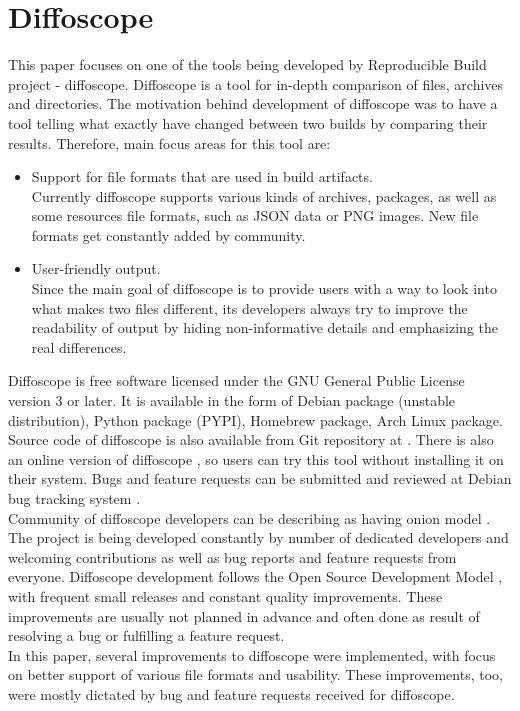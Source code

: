 \section{Diffoscope}

This paper focuses on one of the tools being developed by
Reproducible Build project - diffoscope.
Diffoscope is a tool for in-depth comparison of files, archives and
directories\cite{dfs}.
The motivation behind development of diffoscope was to have a tool
telling what exactly have changed between two builds by comparing 
their results. Therefore, main focus areas for this tool are:
\begin{itemize}
    \item Support for file formats that are used in build artifacts. \\
    Currently diffoscope supports various kinds of archives, packages,
    as well as some resources file formats, such as JSON data or PNG images.
    New file formats get constantly added by community.
    \item User-friendly output.\\
    Since the main goal of diffoscope is to provide users with a way to look
    into what makes two files different, its developers always try to
    improve the readability of output by hiding non-informative details and
    emphasizing the real differences.
\end{itemize}

Diffoscope is free software licensed under the GNU General Public 
License version 3 or later.
It is available in the form of Debian package (unstable distribution), 
Python package (PYPI), Homebrew package, Arch Linux package. Source code
of diffoscope is also available from Git repository at \cite{dfs-git}. 
There is also an online version of diffoscope \cite{try-dfs}, so users 
can try this tool without installing it on their system.
Bugs and feature requests can be submitted and reviewed at Debian
bug tracking system \cite{dfs-bugs}.\\
Community of diffoscope developers can be describing as having
onion model \cite{aberdour2007achieving}.
The project is being developed constantly by number of dedicated 
developers and welcoming contributions as well as bug reports 
and feature requests from everyone.
Diffoscope development follows the Open Source Development Model 
\cite{osdm}, with frequent small releases and constant quality improvements.
These improvements are usually not planned in advance and often
done as result of resolving a bug or fulfilling a feature request.\\
In this paper, several improvements to diffoscope were implemented,
with focus on better support of various file formats and usability.
These improvements, too, were mostly dictated by bug and feature requests
received for diffoscope.



